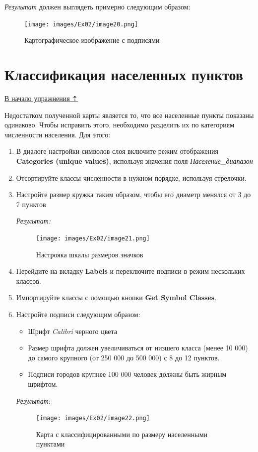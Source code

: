 \documentclass[12pt,]{book}
\providecommand{\tightlist}{%
  \setlength{\itemsep}{0pt}\setlength{\parskip}{0pt}}
\begin{document}
\emph{Результат} должен выглядеть примерно следующим образом:

\begin{figure}
\centering
\texttt{[image: images/Ex02/image20.png]}
\caption{Картографическое изображение с подписями}
\end{figure}

\hypertarget{map-design-general-cities}{%
\section{Классификация населенных пунктов}\label{map-design-general-cities}}

\protect\hyperlink{map-design-general}{В начало упражнения ⇡}

Недостатком полученной карты является то, что все населенные пункты показаны одинаково. Чтобы исправить этого, необходимо разделить их по категориям численности населения. Для этого:

\begin{enumerate}
\def\labelenumi{\arabic{enumi}.}
\item
  В диалоге настройки символов слоя включите режим отображения \textbf{Categories (unique values)}, используя значения поля \emph{Население\_диапазон}
\item
  Отсортируйте классы численности в нужном порядке, используя стрелочки.
\item
  Настройте размер кружка таким образом, чтобы его диаметр менялся от 3 до 7 пунктов

  \emph{Результат:}

  \begin{figure}
  \centering
  \texttt{[image: images/Ex02/image21.png]}
  \caption{Настрояка шкалы размеров значков}
  \end{figure}
\item
  Перейдите на вкладку \textbf{Labels} и переключите подписи в режим нескольких классов.
\item
  Импортируйте классы с помощью кнопки \textbf{Get Symbol Classes}.
\item
  Настройте подписи следующим образом:

  \begin{itemize}
  \tightlist
  \item
    Шрифт \emph{Calibri} черного цвета
  \item
    Размер шрифта должен увеличиваться от низшего класса (менее 10 000) до самого крупного (от 250 000 до 500 000) с 8 до 12 пунктов.
  \item
    Подписи городов крупнее 100 000 человек должны быть жирным шрифтом.
  \end{itemize}

  \emph{Результат}:

  \begin{figure}
  \centering
  \texttt{[image: images/Ex02/image22.png]}
  \caption{Карта с классифицированными по размеру населенными пунктами}
  \end{figure}
\end{enumerate}
\end{document}
